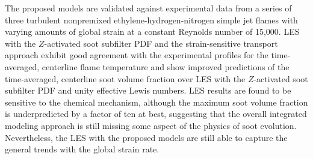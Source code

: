 The proposed models are validated against experimental data from a series of three turbulent nonpremixed ethylene-hydrogen-nitrogen simple jet flames with varying amounts of global strain at a constant Reynolds number of 15,000. LES with the $Z$-activated soot subfilter PDF and the strain-sensitive transport approach exhibit good agreement with the experimental profiles for the time-averaged, centerline flame temperature and show improved predictions of the time-averaged, centerline soot volume fraction over LES with the $Z$-activated soot subfilter PDF and unity effective Lewis numbers. LES results are found to be sensitive to the chemical mechanism, although the maximum soot volume fraction is underpredicted by a factor of ten at best, suggesting that the overall integrated modeling approach is still missing some aspect of the physics of soot evolution. Nevertheless, the LES with the proposed models are still able to capture the general trends with the global strain rate. 



